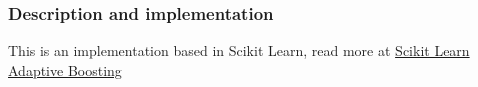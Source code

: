 \subsubsection{Description and implementation}
This is an implementation based in Scikit Learn,
read more at \href{http://scikit-learn.org/stable/modules/ensemble.html#adaboost}{Scikit Learn Adaptive Boosting}

% 

% 

